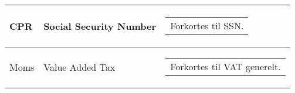 \begin{longtable}{@{}|l|l|l|@{}}
CPR        	     & Social Security Number & \begin{tabular}[c]{@{}l@{}}Forkortes til SSN.\end{tabular}                                                                                                                                                                                                                                                                           \\* \midrule
Moms	         & Value Added Tax  & \begin{tabular}[c]{@{}l@{}}Forkortes til VAT generelt.\end{tabular}                                                                                                                                                       \\* \bottomrule
\end{longtable}